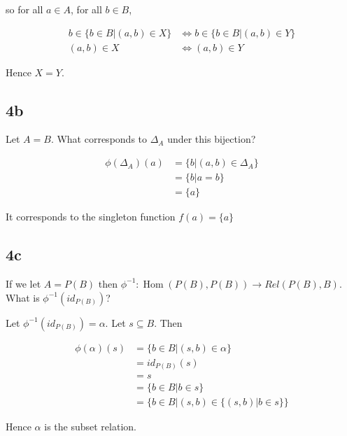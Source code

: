 \documentclass{article}
\DeclareMathOperator{\Hom}{Hom}
\newcommand{\<}{\langle}
\renewcommand{\>}{\rangle}
\begin{document}
so for all $a \in A$, for all $b \in B$,

\begin{align*}
b \in \{b \in B | (a, b) \in X\} &\iff b \in \{b \in B | (a, b) \in Y\} \\
(a, b) \in X &\iff (a, b) \in Y
\end{align*}

Hence $X = Y$.


\subsection*{4b}

Let $A = B$. What corresponds to $\Delta_A$ under this bijection?

\begin{align*}
\phi(\Delta_A)(a) &= \{b | (a, b) \in \Delta_A \} \\
&= \{ b | a = b \} \\
&= \{a\}
\end{align*}

It corresponds to the singleton function $f(a) = \{a\}$

\subsection*{4c}

If we let $A = P(B)$ then $\phi^{-1}: \Hom(P(B), P(B)) \to Rel(P(B), B)$. What is $\phi^{-1}(id_{P(B)})$?

Let $\phi^{-1}(id_{P(B)}) = \alpha$. Let $s \subseteq B$. Then

\begin{align*}
\phi(\alpha)(s) &= \{b \in B | (s, b) \in \alpha \} \\
&= id_{P(B)}(s) \\
&= s \\
&= \{b \in B | b \in s \} \\
&= \{b \in B | (s, b) \in \{(s, b) | b \in s \} \}
\end{align*}

Hence $\alpha$ is the subset relation.
\end{document}
